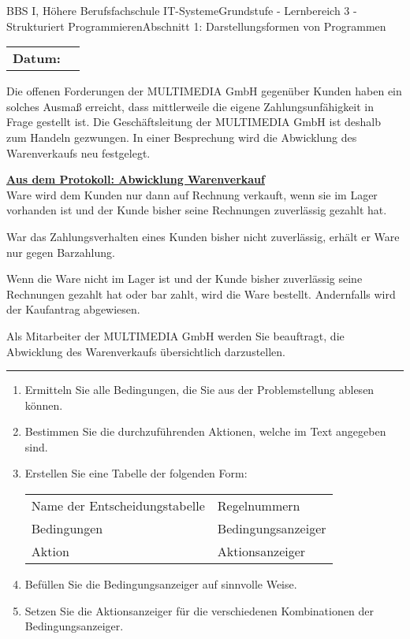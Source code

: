 \documentclass[oneside,openany,headings=optiontotoc,11pt,numbers=noenddot]{scrreprt}
\begin{document}
		\begin{worksheet}{BBS I, Höhere Berufsfachschule IT-Systeme}{Grundstufe - Lernbereich 3 - Strukturiert Programmieren}{Abschnitt 1: Darstellungsformen von Programmen}
			\par\noindent
			\begin{tabularx}{\textwidth}{lX}
				\textbf{Datum:} & \\
				\cline{2-2}
			\end{tabularx}
			\begin{framed}
				\noindent
				 Die offenen Forderungen der MULTIMEDIA GmbH gegenüber Kunden haben ein solches Ausmaß erreicht, dass mittlerweile die eigene Zahlungsunfähigkeit in Frage gestellt ist. Die Geschäftsleitung der MULTIMEDIA GmbH ist deshalb zum Handeln gezwungen. In einer Besprechung wird die Abwicklung des Warenverkaufs neu festgelegt.
				 \begin{framed}
				 	\noindent
				 	\underline{\textbf{Aus dem Protokoll: Abwicklung Warenverkauf}}\\
				 	Ware wird dem Kunden nur dann auf Rechnung verkauft, wenn sie im Lager vorhanden ist und der Kunde bisher seine Rechnungen zuverlässig gezahlt hat.\\
				 	\par\noindent
				 	War das Zahlungsverhalten eines Kunden bisher nicht zuverlässig, erhält er Ware nur gegen Barzahlung.\\
				 	\par\noindent
				 	Wenn die Ware nicht im Lager ist und der Kunde bisher zuverlässig seine Rechnungen gezahlt hat oder bar zahlt, wird die Ware bestellt. Andernfalls wird der Kaufantrag abgewiesen.
				 \end{framed}
			 	\noindent
			 	Als Mitarbeiter der MULTIMEDIA GmbH werden Sie beauftragt, die Abwicklung des Warenverkaufs übersichtlich darzustellen.\\
			 	\rule{0.99\textwidth}{0.1pt}
			 	\begin{enumerate}
			 		\item Ermitteln Sie alle Bedingungen, die Sie aus der Problemstellung ablesen können.
			 		\item Bestimmen Sie die durchzuführenden Aktionen, welche im Text angegeben sind.
			 		\item Erstellen Sie eine Tabelle der folgenden Form:
			 		\\
			 		\begin{tabularx}{\textwidth}{|L{4cm}|L{4cm}|}
			 			 Name der Entscheidungstabelle & Regelnummern\\
			 			Bedingungen & Bedingungsanzeiger\\
			 			Aktion & Aktionsanzeiger\\
			 		\end{tabularx}
			 		\item Befüllen Sie die Bedingungsanzeiger auf sinnvolle Weise.
			 		\item Setzen Sie die Aktionsanzeiger für die verschiedenen Kombinationen der Bedingungsanzeiger.
			 	\end{enumerate}
			\end{framed}
		\end{worksheet}
\end{document}
